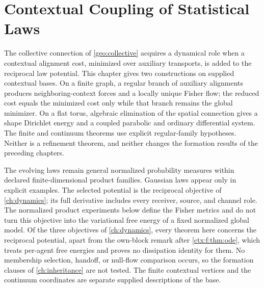 \chapter{Contextual Coupling of Statistical Laws}
\label{ch:contextual-coupling}

The collective connection of \cref{geo:collective} acquires a dynamical role when a contextual alignment cost, minimized over auxiliary transports, is added to the reciprocal law potential. This chapter gives two constructions on supplied contextual bases. On a finite graph, a regular branch of auxiliary alignments produces neighboring-context forces and a locally unique Fisher flow; the reduced cost equals the minimized cost only while that branch remains the global minimizer. On a flat torus, algebraic elimination of the spatial connection gives a shape Dirichlet energy and a coupled parabolic and ordinary differential system. The finite and continuum theorems use explicit regular-family hypotheses. Neither is a refinement theorem, and neither changes the formation results of the preceding chapters.

The evolving laws remain general normalized probability measures within declared finite-dimensional product families. Gaussian laws appear only in explicit examples. The selected potential is the reciprocal objective of \cref{ch:dynamics}; its full derivative includes every receiver, source, and channel role. The normalized product experiments below define the Fisher metrics and do not turn this objective into the variational free energy of a fixed normalized global model. Of the three objectives of \cref{ch:dynamics}, every theorem here concerns the reciprocal potential, apart from the own-block remark after \cref{ctx:f:thm:ode}, which treats per-agent free energies and proves no dissipation identity for them. No membership selection, handoff, or null-flow comparison occurs, so the formation clauses of \cref{ch:inheritance} are not tested. The finite contextual vertices and the continuum coordinates are separate supplied descriptions of the base.

